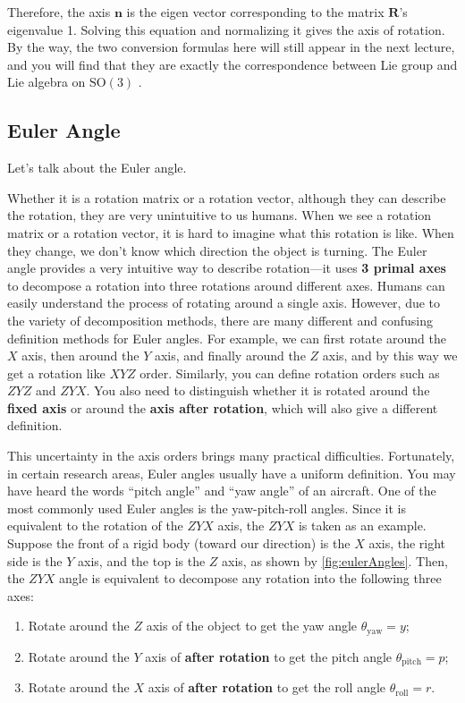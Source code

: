 Therefore, the axis $ \mathbf{n} $ is the eigen vector corresponding to the matrix $ \mathbf{R}$'s eigenvalue 1. Solving this equation and normalizing it gives the axis of rotation. By the way, the two conversion formulas here will still appear in the next lecture, and you will find that they are exactly the correspondence between Lie group and Lie algebra on $ \mathrm{SO}(3) $ .

\subsection{Euler Angle}

Let's talk about the Euler angle.

Whether it is a rotation matrix or a rotation vector, although they can describe the rotation, they are very unintuitive to us humans. When we see a rotation matrix or a rotation vector, it is hard to imagine what this rotation is like. When they change, we don't know which direction the object is turning. The Euler angle provides a very intuitive way to describe rotation—it uses \textbf{3 primal axes} to decompose a rotation into three rotations around different axes. Humans can easily understand the process of rotating around a single axis. However, due to the variety of decomposition methods, there are many different and confusing definition methods for Euler angles. For example, we can first rotate around the $X$ axis, then around the $Y$ axis, and finally around the $Z$ axis, and by this way we get a rotation like $XYZ$ order. Similarly, you can define rotation orders such as $ZYZ$ and $ZYX$. You also need to distinguish whether it is rotated around the \textbf{fixed axis} or around the \textbf{axis after rotation}, which will also give a different definition.

This uncertainty in the axis orders brings many practical difficulties. Fortunately, in certain research areas, Euler angles usually have a uniform definition. You may have heard the words ``pitch angle'' and ``yaw angle'' of an aircraft. One of the most commonly used Euler angles is the yaw-pitch-roll angles. Since it is equivalent to the rotation of the $ZYX$ axis, the $ZYX$ is taken as an example. Suppose the front of a rigid body (toward our direction) is the $X$ axis, the right side is the $Y$ axis, and the top is the $Z$ axis, as shown by \autoref{fig:eulerAngles}. Then, the $ZYX$ angle is equivalent to decompose any rotation into the following three axes:

\begin{enumerate}
    \item Rotate around the $Z$ axis of the object to get the yaw angle $\theta_{\mathrm{yaw}}=y$;
    \item Rotate around the $Y$ axis of \textbf{after rotation} to get the pitch angle $\theta_{\mathrm{pitch}}=p$;
    \item Rotate around the $X$ axis of \textbf{after rotation} to get the roll angle $\theta_{\mathrm{roll}}=r$.
\end{enumerate}

